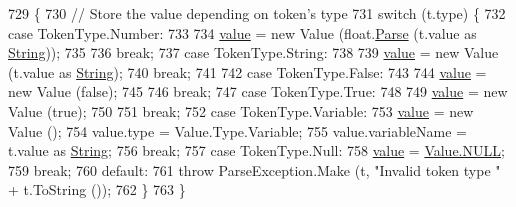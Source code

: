 \begin{DoxyCode}
729                                            \{
730                 \textcolor{comment}{// Store the value depending on token's type}
731                 \textcolor{keywordflow}{switch} (t.type) \{
732                 \textcolor{keywordflow}{case} TokenType.Number:
733 
734                     \hyperlink{a00162_a51ab5939344f9bfa21181c02cf0e341d}{value} = \textcolor{keyword}{new} Value (\textcolor{keywordtype}{float}.\hyperlink{a00121_a811cc7226f4f4a2f3440cdb67ad14468}{Parse} (t.value as \hyperlink{a00029_a301aa7c866593a5b625a8fc158bbeacea27118326006d3829667a400ad23d5d98}{String}));
735 
736                     \textcolor{keywordflow}{break};
737                 \textcolor{keywordflow}{case} TokenType.String:
738 
739                     \hyperlink{a00162_a51ab5939344f9bfa21181c02cf0e341d}{value} = \textcolor{keyword}{new} Value (t.value as \hyperlink{a00029_a301aa7c866593a5b625a8fc158bbeacea27118326006d3829667a400ad23d5d98}{String});
740                     \textcolor{keywordflow}{break};
741 
742                 \textcolor{keywordflow}{case} TokenType.False:
743 
744                     \hyperlink{a00162_a51ab5939344f9bfa21181c02cf0e341d}{value} = \textcolor{keyword}{new} Value (\textcolor{keyword}{false});
745 
746                     \textcolor{keywordflow}{break};
747                 \textcolor{keywordflow}{case} TokenType.True:
748 
749                     \hyperlink{a00162_a51ab5939344f9bfa21181c02cf0e341d}{value} = \textcolor{keyword}{new} Value (\textcolor{keyword}{true});
750 
751                     \textcolor{keywordflow}{break};
752                 \textcolor{keywordflow}{case} TokenType.Variable:
753                     \hyperlink{a00162_a51ab5939344f9bfa21181c02cf0e341d}{value} = \textcolor{keyword}{new} Value ();
754                     value.type = Value.Type.Variable;
755                     value.variableName = t.value as \hyperlink{a00029_a301aa7c866593a5b625a8fc158bbeacea27118326006d3829667a400ad23d5d98}{String};
756                     \textcolor{keywordflow}{break};
757                 \textcolor{keywordflow}{case} TokenType.Null:
758                     \hyperlink{a00162_a51ab5939344f9bfa21181c02cf0e341d}{value} = \hyperlink{a00161_a1ed2964965baca8621c45efa23f37660}{Value.NULL};
759                     \textcolor{keywordflow}{break};
760                 \textcolor{keywordflow}{default}:
761                     \textcolor{keywordflow}{throw} ParseException.Make (t, \textcolor{stringliteral}{"Invalid token type "} + t.ToString ());
762                 \}
763             \}
\end{DoxyCode}


